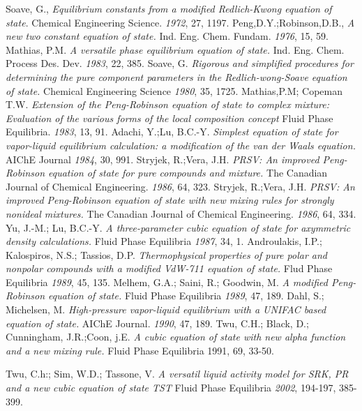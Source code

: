 \begin{thebibliography}{99}

	Soave, G.,
	\emph{Equilibrium constants from a modified Redlich-Kwong equation of state}. 
	Chemical Engineering Science.
	\emph{1972},
	27,
	1197. 
	Peng,D.Y.;Robinson,D.B.,
	\emph{A new two constant equation of state.}
	Ind. Eng. Chem. Fundam. 
	\emph{1976},
	15,
	59.
	Mathias, P.M. 
	\emph{A versatile phase equilibrium equation of state.}
	Ind. Eng. Chem. Process Des. Dev.
	\emph{1983},
	22,
	385.
	Soave, G. 
	\emph{Rigorous and simplified procedures for determining the pure component parameters in the Redlich-wong-Soave equation of state.}
	Chemical Engineering Science 
	\emph{1980},
	35,
	1725.
	Mathias,P.M; Copeman T.W.
	\emph{Extension of the Peng-Robinson equation of state to complex mixture: Evaluation of the various forms of the local composition concept}
	Fluid Phase Equilibria.
	\emph{1983},
	13,
	91.
	Adachi, Y.;Lu, B.C.-Y. 
	\emph{Simplest equation of state for vapor-liquid equilibrium calculation: a modification of the van der Waals equation.}
	AIChE Journal 
	\emph{1984},
	30,
	991.
	Stryjek, R.;Vera, J.H. 
	\emph{PRSV: An improved Peng-Robinson equation of state for pure compounds and mixture.}
	The Canadian Journal of Chemical Engineering. 
	\emph{1986},
	64,
	323.
	Stryjek, R.;Vera, J.H. 
	\emph{PRSV: An improved Peng-Robinson equation of state with new mixing rules for strongly nonideal mixtures.}
	The Canadian Journal of Chemical Engineering. 
	\emph{1986},
	64,
	334.
	Yu, J.-M.; Lu, B.C.-Y.
	\emph{A three-parameter cubic equation of state for axymmetric density calculations.}
	 Fluid Phase Equilibria
	\emph{1987},
	34,
	1.
	Androulakis, I.P.; Kalospiros, N.S.; Tassios, D.P.
	\emph{Thermophysical properties of pure polar and nonpolar compounds with a modified VdW-711 equation of state.}
	Flud Phase Equilibria 
	\emph{1989},
	45,
	135.
	Melhem, G.A.; Saini, R.; Goodwin, M.
	\emph{A modified Peng-Robinson equation of state.}
	Fluid Phase Equilibria
	\emph{1989},
	47,
	189.
	Dahl, S.; Michelsen, M. 
	\emph{High-pressure vapor-liquid equilibrium with a UNIFAC based equation of state.}
	AIChE Journal. 
	\emph{1990},
	47,
	189.
	Twu, C.H.; Black, D.; Cunningham, J.R.;Coon, j.E. 
	\emph{A cubic equation of state with new alpha function and a new mixing rule.}
	Fluid Phase Equilibria 1991, 69, 33-50.

	Twu, C.h:; Sim, W.D.; Tassone, V.
	\emph{A versatil liquid activity model for SRK, PR and a new cubic equation of state TST}
	Fluid Phase Equilibria
	\emph{2002},
	194-197,
	385-399.

\end{thebibliography}